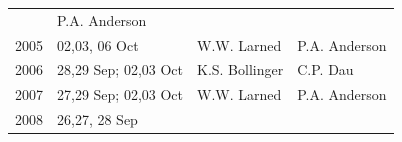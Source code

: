 \documentclass[]{article}
\begin{document}
\begin{longtable}[]{@{}llll@{}}
\begin{minipage}[t]{0.18\columnwidth}
\end{minipage} & \begin{minipage}[t]{0.20\columnwidth}\raggedright\strut
P.A. Anderson\strut
\end{minipage}\tabularnewline
\begin{minipage}[t]{0.12\columnwidth}\raggedright\strut
2005\strut
\end{minipage} & \begin{minipage}[t]{0.38\columnwidth}\raggedright\strut
02,03, 06 Oct\strut
\end{minipage} & \begin{minipage}[t]{0.18\columnwidth}\raggedright\strut
W.W. Larned\strut
\end{minipage} & \begin{minipage}[t]{0.20\columnwidth}\raggedright\strut
P.A. Anderson\strut
\end{minipage}\tabularnewline
\begin{minipage}[t]{0.12\columnwidth}\raggedright\strut
2006\strut
\end{minipage} & \begin{minipage}[t]{0.38\columnwidth}\raggedright\strut
28,29 Sep; 02,03 Oct\strut
\end{minipage} & \begin{minipage}[t]{0.18\columnwidth}\raggedright\strut
K.S. Bollinger\strut
\end{minipage} & \begin{minipage}[t]{0.20\columnwidth}\raggedright\strut
C.P. Dau\strut
\end{minipage}\tabularnewline
\begin{minipage}[t]{0.12\columnwidth}\raggedright\strut
2007\strut
\end{minipage} & \begin{minipage}[t]{0.38\columnwidth}\raggedright\strut
27,29 Sep; 02,03 Oct\strut
\end{minipage} & \begin{minipage}[t]{0.18\columnwidth}\raggedright\strut
W.W. Larned\strut
\end{minipage} & \begin{minipage}[t]{0.20\columnwidth}\raggedright\strut
P.A. Anderson\strut
\end{minipage}\tabularnewline
\begin{minipage}[t]{0.12\columnwidth}\raggedright\strut
2008\strut
\end{minipage} & \begin{minipage}[t]{0.38\columnwidth}\raggedright\strut
26,27, 28 Sep\strut

\end{minipage}
\end{longtable}
\end{document}
